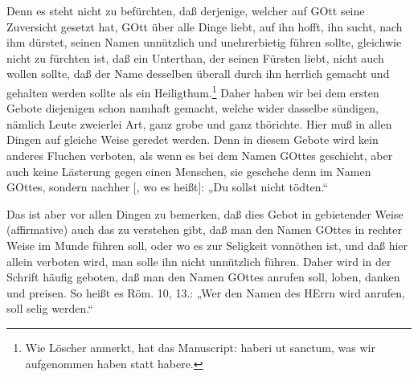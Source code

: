Denn es steht nicht zu befürchten, daß derjenige, welcher auf GOtt seine Zuversicht gesetzt hat, GOtt über alle Dinge liebt, auf ihn hofft, ihn sucht, nach ihm dürstet, seinen Namen unnützlich und unehrerbietig führen sollte, gleichwie nicht zu fürchten ist, daß ein Unterthan, der seinen Fürsten liebt, nicht auch wollen sollte, daß der Name desselben überall durch ihn herrlich gemacht und gehalten werden sollte als ein Heiligthum.\footnote{Wie Löscher anmerkt, hat das Manuscript: haberi ut sanctum, was wir aufgenommen haben statt habere.} Daher haben wir bei dem ersten Gebote diejenigen schon namhaft gemacht, welche wider dasselbe sündigen, nämlich Leute zweierlei Art, ganz grobe und ganz thörichte. Hier muß in allen Dingen auf gleiche Weise geredet werden. Denn in diesem Gebote wird kein anderes Fluchen verboten, als wenn es bei dem Namen GOttes geschieht, aber auch keine Lästerung gegen einen Menschen, sie geschehe denn im Namen GOttes, sondern nachher [, wo es heißt]: „Du sollst nicht tödten.“

Das ist aber vor allen Dingen zu bemerken, daß dies Gebot in gebietender Weise (affirmative) auch das zu verstehen gibt, daß man den Namen GOttes in rechter Weise im Munde führen soll, oder wo es zur Seligkeit vonnöthen ist, und daß hier allein verboten wird, man solle ihn nicht unnützlich führen. Daher wird in der Schrift häufig geboten, daß man den Namen GOttes anrufen soll, loben, danken und preisen. So heißt es Röm. 10, 13.: „Wer den Namen des HErrn wird anrufen, soll selig werden.“

